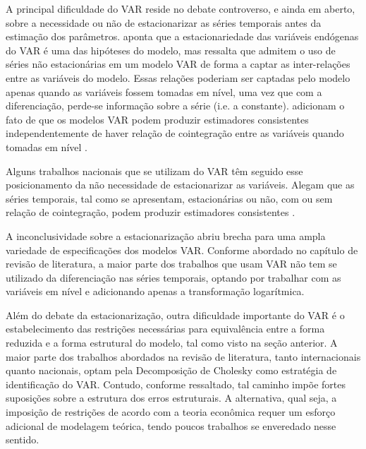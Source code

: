 A principal dificuldade do VAR reside no debate controverso, e ainda em aberto, sobre a necessidade ou não de estacionarizar as séries temporais antes da estimação dos parâmetros. \textcite{de_losso_econometria_2012} aponta que a estacionariedade das variáveis endógenas do VAR é uma das hipóteses do modelo, mas ressalta que \textcite{sims_inference_1990} admitem o uso de séries não estacionárias em um modelo VAR de forma a captar as inter-relações entre as variáveis do modelo. Essas relações poderiam ser captadas pelo modelo apenas quando as variáveis fossem tomadas em nível, uma vez que com a diferenciação, perde-se informação sobre a série (i.e. a constante). \textcite{bernanke_measuring_1998} adicionam o fato de que os modelos VAR podem produzir estimadores consistentes independentemente de haver relação de cointegração entre as variáveis quando tomadas em nível \parencite{de_losso_econometria_2012, araujo_nao-linearidade_2015}.   

Alguns trabalhos nacionais que se utilizam do VAR têm seguido esse posicionamento da não necessidade de estacionarizar as variáveis. Alegam que as séries temporais, tal como se apresentam, estacionárias ou não, com ou sem relação de cointegração, podem produzir estimadores consistentes \parencite{toda_statistical_1995, filho_politica_2006, tomazzia_transmissao_2011, araujo_nao-linearidade_2015}. 

A inconclusividade sobre a estacionarização abriu brecha para uma ampla variedade de especificações dos modelos VAR. Conforme abordado no capítulo de revisão de literatura, a maior parte dos trabalhos que usam VAR não tem se utilizado da diferenciação nas séries temporais, optando por trabalhar com as variáveis em nível e adicionando apenas a transformação logarítmica. 

Além do debate da estacionarização, outra dificuldade importante do VAR é o estabelecimento das restrições necessárias para equivalência entre a forma reduzida e a forma estrutural do modelo, tal como visto na seção anterior. A maior parte dos trabalhos abordados na revisão de literatura, tanto internacionais quanto nacionais, optam pela Decomposição de Cholesky como estratégia de identificação do VAR. Contudo, conforme ressaltado, tal caminho impõe fortes suposições sobre a estrutura dos erros estruturais. A alternativa, qual seja, a imposição de restrições de acordo com a teoria econômica requer um esforço adicional de modelagem teórica, tendo poucos trabalhos se enveredado nesse sentido. 

